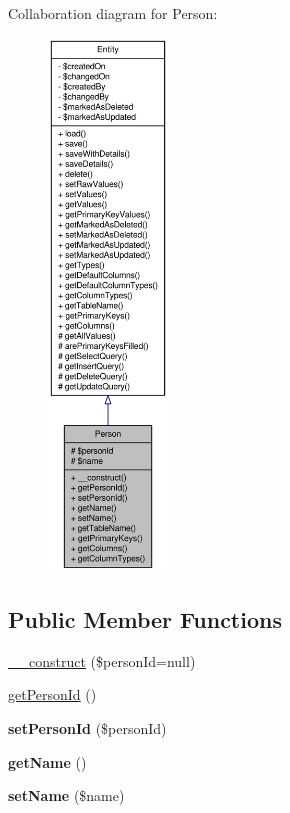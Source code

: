 Collaboration diagram for Person:\nopagebreak
\begin{figure}[H]
\begin{center}
\leavevmode
\includegraphics[height=400pt]{classPerson__coll__graph}
\end{center}
\end{figure}
\subsection*{Public Member Functions}
\begin{DoxyCompactItemize}
\item 
\hyperlink{classPerson_ae90ab9571c872e6b130d2cf46c1b47ce}{\_\-\_\-construct} (\$personId=null)
\item 
\hyperlink{classPerson_afadb1ac8614a060035c9992d2663e27e}{getPersonId} ()
\item 
\hypertarget{classPerson_a0033c4269f371539c82017b8e422ba39}{
{\bfseries setPersonId} (\$personId)}
\label{classPerson_a0033c4269f371539c82017b8e422ba39}

\item 
\hypertarget{classPerson_a48daf41676305e51a36b5452e2fe44c7}{
{\bfseries getName} ()}
\label{classPerson_a48daf41676305e51a36b5452e2fe44c7}

\item 
\hypertarget{classPerson_ae8252b8d2ada0b6aff2afe41e3185119}{
{\bfseries setName} (\$name)}
\label{classPerson_ae8252b8d2ada0b6aff2afe41e3185119}

\end{DoxyCompactItemize}
